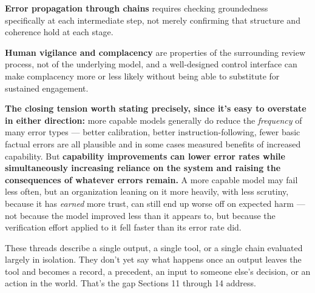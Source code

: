 \textbf{Error propagation through chains} requires checking groundedness specifically at each intermediate step, not merely confirming that structure and coherence hold at each stage.

\textbf{Human vigilance and complacency} are properties of the surrounding review process, not of the underlying model, and a well-designed control interface can make complacency more or less likely without being able to substitute for sustained engagement.

\textbf{The closing tension worth stating precisely, since it's easy to overstate in either direction:} more capable models generally do reduce the \emph{frequency} of many error types --- better calibration, better instruction-following, fewer basic factual errors are all plausible and in some cases measured benefits of increased capability. But \textbf{capability improvements can lower error rates while simultaneously increasing reliance on the system and raising the consequences of whatever errors remain.} A more capable model may fail less often, but an organization leaning on it more heavily, with less scrutiny, because it has \emph{earned} more trust, can still end up worse off on expected harm --- not because the model improved less than it appears to, but because the verification effort applied to it fell faster than its error rate did.

These threads describe a single output, a single tool, or a single chain evaluated largely in isolation. They don't yet say what happens once an output leaves the tool and becomes a record, a precedent, an input to someone else's decision, or an action in the world. That's the gap Sections 11 through 14 address.
